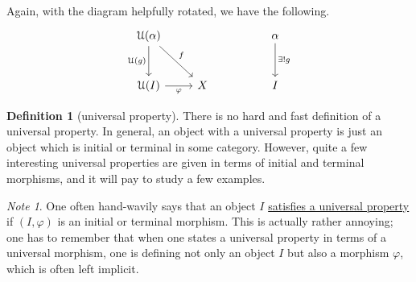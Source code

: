 \documentclass[a4paper]{report}
\newcommand{\defn}[1]{\ul{#1}}
\theoremstyle{definition}
\newtheorem{definition}{Definition}[section]
\theoremstyle{plain}
\theoremstyle{remark}
\newtheorem{note}{Note}[section]
\begin{document}
Again, with the diagram helpfully rotated, we have the following.
\begin{equation*}
  \begin{tikzcd}[row sep=large]
    \mathcal{U}(\alpha) \arrow[d, swap, "\mathcal{U}(g)"] \arrow[rd, "f"] & & & \alpha \arrow[d, "\exists!g"]\\
    \mathcal{U}(I) \arrow[r, swap, "\varphi"] & X & & I
  \end{tikzcd}
\end{equation*}
\begin{definition}[universal property]
  \label{def:universalproperty}
  There is no hard and fast definition of a universal property. In general, an object with a universal property is just an object which is initial or terminal in some category. However, quite a few interesting universal properties are given in terms of initial and terminal morphisms, and it will pay to study a few examples.
\end{definition}

\begin{note}
  One often hand-wavily says that an object $I$ \defn{satisfies a universal property} if $(I, \varphi)$ is an initial or terminal morphism. This is actually rather annoying; one has to remember that when one states a universal property in terms of a universal morphism, one is defining not only an object $I$ but also a morphism $\varphi$, which is often left implicit.
\end{note}
\end{document}
